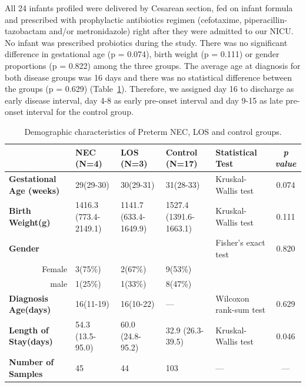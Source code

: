 \documentclass[fleqn,10pt]{wlpeerj} %
\begin{document}
   All 24 infants profiled were delivered by Cesarean section, fed on infant formula and prescribed with prophylactic antibiotics regimen (cefotaxime, piperacillin-tazobactam and/or metronidazole) right after they were admitted to our NICU. No infant was prescribed probiotics during the study. There was no significant difference in gestational age (p = 0.074), birth weight (p = 0.111) or gender proportions (p = 0.822) among the three groups. The average age at diagnosis for both disease groups was 16 days and there was no statistical difference between the groups (p = 0.629) (Table~\ref{tab:demographic}). Therefore, we assigned day 16 to discharge as early disease interval, day 4-8 as early pre-onset interval and day 9-15 as late pre-onset interval for the control group.
    \begin{table}[!hpb]
       \centering
       \caption{\label{tab:demographic}Demographic characteristics of Preterm NEC, LOS and control groups.}
      \begin{tabular}{lp{1.8cm}p{1.8cm}p{1.8cm}p{2cm}c}
        \toprule
          & \textbf{NEC (N=4)} & \textbf{LOS (N=3)} & \textbf{Control (N=17)} & \textbf{Statistical Test} & \textit{p value} \\ \midrule
        \textbf{Gestational Age (weeks)} & 29(29-30) & 30(29-31) & 31(28-33) & Kruskal-Wallis test & 0.074 \\
        \textbf{Birth Weight(g)} & 1416.3 (773.4-2149.1) & 1141.7 (633.4-1649.9) & 1527.4 (1391.6-1663.1) & Kruskal-Wallis test & 0.111 \\
        \textbf{Gender} &  &  &  & Fisher's exact test & 0.820 \\
        \multicolumn{1}{r}{Female} & 3(75\%) & 2(67\%) & 9(53\%) &  & \\
        \multicolumn{1}{r}{male} & 1(25\%) & 1(33\%) & 8(47\%) &  & \\
        \textbf{Diagnosis Age(days)} & 16(11-19) & 16(10-22) & — & Wilcoxon rank-sum test & 0.629 \\
        \textbf{Length of Stay(days)} & 54.3 (13.5-95.0) & 60.0 (24.8-95.2) & 32.9 (26.3-39.5) & Kruskal-Wallis test & 0.046 \\
        \textbf{Number of Samples} & 45 & 44 & 103 & — & — \\ \bottomrule
      \end{tabular}
    \end{table}
\end{document}
